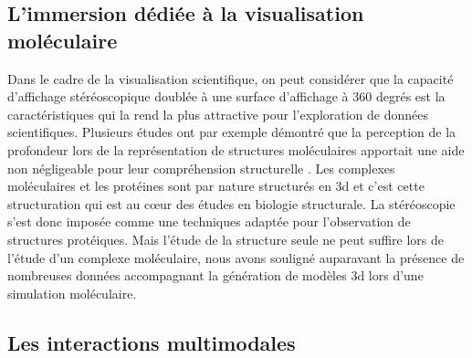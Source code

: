 \subsection{L'immersion dédiée à la visualisation moléculaire}

Dans le cadre de la visualisation scientifique, on peut considérer que la capacité d'affichage stéréoscopique doublée à une surface d'affichage à 360 degrés est la caractéristiques qui la rend la plus attractive pour l'exploration de données scientifiques. Plusieurs études ont par exemple démontré que la perception de la profondeur lors de la représentation de structures moléculaires apportait une aide non négligeable pour leur compréhension structurelle \cite{van_dam_immersive_2000,stone_immersive_2010,odonoghue_visualization_2010}. Les complexes moléculaires et les protéines sont par nature structurés en 3d et c'est cette structuration qui est au cœur des études en biologie structurale. La stéréoscopie s'est donc imposée comme une techniques adaptée pour l'observation de structures protéiques. 
Mais l'étude de la structure seule ne peut suffire lors de l'étude d'un complexe moléculaire, nous avons souligné auparavant la présence de nombreuses données accompagnant la génération de modèles 3d lors d'une simulation moléculaire. 



\subsection{Les interactions multimodales}

